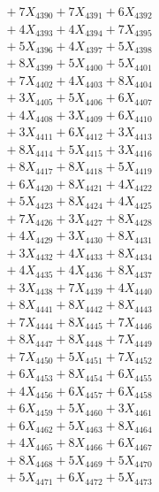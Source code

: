 \documentclass[a4paper,10pt]{article}
\begin{document}
{\begin{align}
&\;  + 7 X_{4390} + 7 X_{4391} + 6 X_{4392} \\[0.3ex]
&\;  + 4 X_{4393} + 4 X_{4394} + 7 X_{4395} \\[0.3ex]
&\;  + 5 X_{4396} + 4 X_{4397} + 5 X_{4398} \\[0.3ex]
&\;  + 8 X_{4399} + 5 X_{4400} + 5 X_{4401} \\[0.3ex]
&\;  + 7 X_{4402} + 4 X_{4403} + 8 X_{4404} \\[0.3ex]
&\;  + 3 X_{4405} + 5 X_{4406} + 6 X_{4407} \\[0.3ex]
&\;  + 4 X_{4408} + 3 X_{4409} + 6 X_{4410} \\[0.3ex]
&\;  + 3 X_{4411} + 6 X_{4412} + 3 X_{4413} \\[0.3ex]
&\;  + 8 X_{4414} + 5 X_{4415} + 3 X_{4416} \\[0.3ex]
&\;  + 8 X_{4417} + 8 X_{4418} + 5 X_{4419} \\[0.5ex]\allowbreak
&\;  + 6 X_{4420} + 8 X_{4421} + 4 X_{4422} \\[0.3ex]
&\;  + 5 X_{4423} + 8 X_{4424} + 4 X_{4425} \\[0.3ex]
&\;  + 7 X_{4426} + 3 X_{4427} + 8 X_{4428} \\[0.3ex]
&\;  + 4 X_{4429} + 3 X_{4430} + 8 X_{4431} \\[0.3ex]
&\;  + 3 X_{4432} + 4 X_{4433} + 8 X_{4434} \\[0.3ex]
&\;  + 4 X_{4435} + 4 X_{4436} + 8 X_{4437} \\[0.3ex]
&\;  + 3 X_{4438} + 7 X_{4439} + 4 X_{4440} \\[0.3ex]
&\;  + 8 X_{4441} + 8 X_{4442} + 8 X_{4443} \\[0.3ex]
&\;  + 7 X_{4444} + 8 X_{4445} + 7 X_{4446} \\[0.3ex]
&\;  + 8 X_{4447} + 8 X_{4448} + 7 X_{4449} \\[0.5ex]\allowbreak
&\;  + 7 X_{4450} + 5 X_{4451} + 7 X_{4452} \\[0.3ex]
&\;  + 6 X_{4453} + 8 X_{4454} + 6 X_{4455} \\[0.3ex]
&\;  + 4 X_{4456} + 6 X_{4457} + 6 X_{4458} \\[0.3ex]
&\;  + 6 X_{4459} + 5 X_{4460} + 3 X_{4461} \\[0.3ex]
&\;  + 6 X_{4462} + 5 X_{4463} + 8 X_{4464} \\[0.3ex]
&\;  + 4 X_{4465} + 8 X_{4466} + 6 X_{4467} \\[0.3ex]
&\;  + 8 X_{4468} + 5 X_{4469} + 5 X_{4470} \\[0.3ex]
&\;  + 5 X_{4471} + 6 X_{4472} + 5 X_{4473} \\[0.3ex]

\end{align}}
\end{document}
